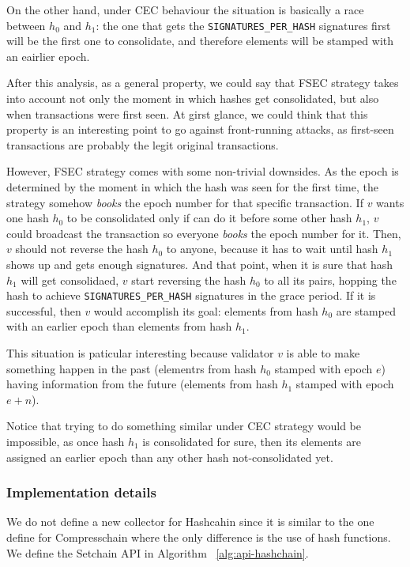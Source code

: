 On the other hand, under CEC behaviour the situation is basically a race between
$h_0$ and $h_1$: the one that gets the \texttt{SIGNATURES\_PER\_HASH} signatures first will
be the first one to consolidate, and therefore elements will be stamped with an eairlier epoch.

After this analysis, as a general property, we could say that FSEC strategy takes into account
not only the
moment in which hashes get consolidated, but also when transactions were first seen.
At girst glance, we could think that this property is an interesting point to go against
front-running attacks, as first-seen transactions are probably the legit original transactions.

However, FSEC strategy comes with some non-trivial downsides.
As the epoch is determined by the moment in which the hash was seen for the first time,
the strategy somehow \textit{books} the epoch number for that specific transaction.
If $v$ wants one hash $h_0$ to be consolidated only if can do it before some other 
hash $h_1$, $v$ could broadcast the transaction so everyone \textit{books}
the epoch number for it.
Then, $v$ should not reverse the hash $h_0$ to anyone, because it has to wait until hash
$h_1$ shows up and gets enough signatures. And that point, when it is sure that hash
$h_1$ will get consolidaed, $v$ start reversing the hash $h_0$ to all its pairs, hopping the
hash to achieve \texttt{SIGNATURES\_PER\_HASH} signatures in the grace period.
If it is successful, then $v$ would accomplish its goal:
elements from hash $h_0$ are stamped with an earlier epoch than elements from
hash $h_1$.

This situation is paticular interesting because validator $v$ is able to make something
happen in the past (elementrs from hash $h_0$ stamped with epoch $e$) having information
from the future (elements from hash $h_1$ stamped with epoch $e+n$).

Notice that trying to do something similar under CEC strategy would be impossible, as once
hash $h_1$ is consolidated for sure, then its elements are assigned an earlier epoch than any
other hash not-consolidated yet.



\subsubsection{Implementation details}\label{subsubsec:details}

We do not define a new collector for Hashcahin since it is similar to the one
define for Compresschain where the only difference is the use of hash functions.
%
We define the Setchain API in Algorithm ~\ref{alg:api-hashchain}.

